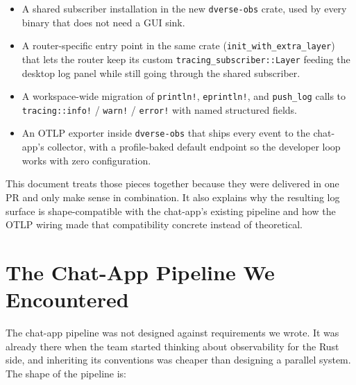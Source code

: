 \documentclass[11pt,a4paper]{article}
\begin{document}
\begin{itemize}
  \item A shared subscriber installation in the new
        \texttt{dverse-obs} crate, used by every binary that
        does not need a GUI sink.
  \item A router-specific entry point in the same crate
        (\texttt{init\_with\_extra\_layer}) that lets the router
        keep its custom \texttt{tracing\_subscriber::Layer}
        feeding the desktop log panel while still going through
        the shared subscriber.
  \item A workspace-wide migration of \texttt{println!},
        \texttt{eprintln!}, and \texttt{push\_log} calls to
        \texttt{tracing::info!} / \texttt{warn!} / \texttt{error!}
        with named structured fields.
  \item An OTLP exporter inside \texttt{dverse-obs} that ships
        every event to the chat-app's collector, with a
        profile-baked default endpoint so the developer loop
        works with zero configuration.
\end{itemize}

This document treats those pieces together because they were
delivered in one PR and only make sense in combination. It also
explains why the resulting log surface is shape-compatible with
the chat-app's existing pipeline and how the OTLP wiring made
that compatibility concrete instead of theoretical.

\section{The Chat-App Pipeline We Encountered}

The chat-app pipeline was not designed against requirements we
wrote. It was already there when the team started thinking about
observability for the Rust side, and inheriting its conventions
was cheaper than designing a parallel system. The shape of the
pipeline is:
\end{document}
